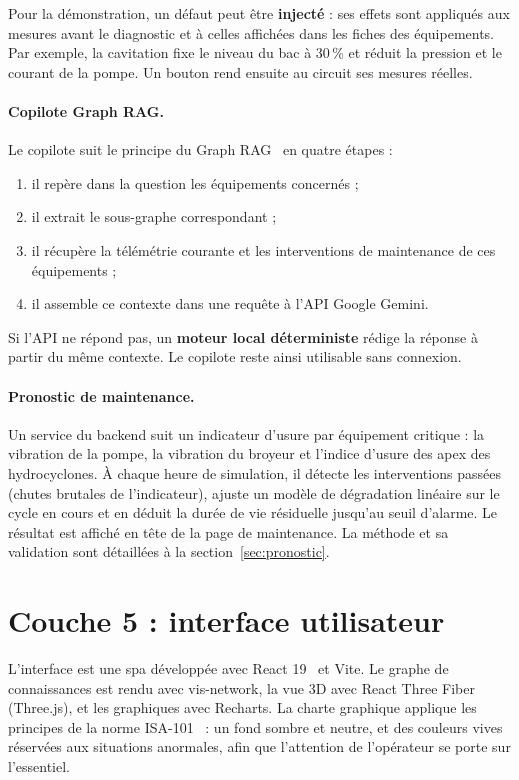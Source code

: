 Pour la démonstration, un défaut peut être \textbf{injecté} : ses effets sont appliqués aux mesures avant le diagnostic et à celles affichées dans les fiches des équipements. Par exemple, la cavitation fixe le niveau du bac à 30\,\% et réduit la pression et le courant de la pompe. Un bouton rend ensuite au circuit ses mesures réelles.

\paragraph{Copilote Graph RAG.} Le copilote suit le principe du Graph RAG~\cite{edge2024,lewis2020} en quatre étapes :
\begin{enumerate}
  \item il repère dans la question les équipements concernés ;
  \item il extrait le sous-graphe correspondant ;
  \item il récupère la télémétrie courante et les interventions de maintenance de ces équipements ;
  \item il assemble ce contexte dans une requête à l'API Google Gemini.
\end{enumerate}
Si l'API ne répond pas, un \textbf{moteur local déterministe} rédige la réponse à partir du même contexte. Le copilote reste ainsi utilisable sans connexion.

\paragraph{Pronostic de maintenance.} Un service du backend suit un indicateur d'usure par équipement critique : la vibration de la pompe, la vibration du broyeur et l'indice d'usure des apex des hydrocyclones. À chaque heure de simulation, il détecte les interventions passées (chutes brutales de l'indicateur), ajuste un modèle de dégradation linéaire sur le cycle en cours et en déduit la durée de vie résiduelle jusqu'au seuil d'alarme. Le résultat est affiché en tête de la page de maintenance. La méthode et sa validation sont détaillées à la section~\ref{sec:pronostic}.

\section{Couche 5 : interface utilisateur}
L'interface est une \gls{spa} développée avec React 19~\cite{react} et Vite. Le graphe de connaissances est rendu avec vis-network, la vue 3D avec React Three Fiber~\cite{r3f} (Three.js), et les graphiques avec Recharts. La charte graphique applique les principes de la norme ISA-101~\cite{isa101} : un fond sombre et neutre, et des couleurs vives réservées aux situations anormales, afin que l'attention de l'opérateur se porte sur l'essentiel.

